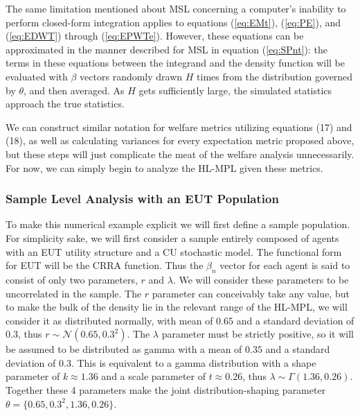 \documentclass[../main.tex]{subfiles}
\begin{document}
The same limitation mentioned about MSL concerning a computer's inability to perform closed-form integration applies to equations (\ref{eq:EMt}), (\ref{eq:PE}), and (\ref{eq:EDWT}) through (\ref{eq:EPWTe}).
However, these equations can be approximated in the manner described for MSL in equation (\ref{eq:SPnt}): the terms in these equations between the integrand and the density function will be evaluated with $\beta$ vectors randomly drawn $H$ times from the distribution governed by $\theta$, and then averaged.
As $H$ gets sufficiently large, the simulated statistics approach the true statistics.

We can construct similar notation for welfare metrics utilizing equations (17) and (18), as well as calculating variances for every expectation metric proposed above, but these steps will just complicate the meat of the welfare analysis unnecessarily.
For now, we can simply begin to analyze the HL-MPL given these metrics.

\subsubsection{Sample Level Analysis with an EUT Population}

To make this numerical example explicit we will first define a sample population.
For simplicity sake, we will first consider a sample entirely composed of agents with an EUT utility structure and a CU stochastic model.
The functional form for EUT will be the CRRA function.
Thus the $\beta_n$ vector for each agent is said to consist of only two parameters, $r$ and $\lambda$.
We will consider these parameters to be uncorrelated in the sample.
The $r$ parameter can conceivably take any value, but to make the bulk of the density lie in the relevant range of the HL-MPL, we will consider it as distributed normally, with mean of $0.65$ and a standard deviation of $0.3$, thus $r \sim \mathcal{N}(0.65 , 0.3^2 )$.
The $\lambda$ parameter must be strictly positive, so it will be assumed to be distributed as gamma with a mean of $0.35$ and a standard deviation of $0.3$.
This is equivalent to a gamma distribution with a shape parameter of $k \approx 1.36$ and a scale parameter of $t\approx0.26$, thus $\lambda \sim \Gamma(1.36 , 0.26)$.
Together these 4 parameters make the joint distribution-shaping parameter $\theta=\{0.65 ,0.3^2, 1.36 , 0.26\}$.
\end{document}
